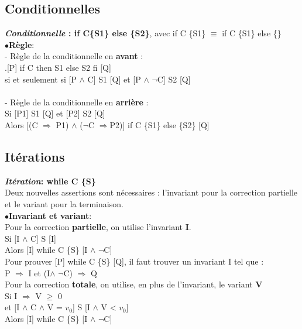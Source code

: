 \subsection{Conditionnelles}
\textbf{\textit{Conditionnelle} : if C\{S1\} else \{S2\}}, avec if C \{S1\} $\equiv$ if C \{S1\} else \{\} \\

$\bullet$\textbf{Règle}:\\
- Règle de la conditionnelle en \textbf{avant} :\\
.[P] if C then S1 else S2 fi [Q] \\si et seulement si  [P $ \wedge$ C] S1 [Q] et [P $\wedge$ $\neg$C] S2 [Q]\\\vspace{2,5mm}\\
- Règle de la conditionnelle en \textbf{arrière} :\\
Si [P1] S1 [Q] et [P2] S2 [Q] \\ Alors [(C $\Rightarrow$ P1) $\wedge$ ($\neg$C $\Rightarrow$P2)] if C \{S1\} else \{S2\} [Q]
\subsection{Itérations}
\textbf{\textit{Itération}: while C \{S\}}\\
Deux nouvelles assertions sont nécessaires : l'invariant pour la correction partielle et le variant pour la terminaison.\\

$\bullet$\textbf{Invariant et variant}:\\

Pour la correction \textbf{partielle}, on utilise l'invariant \textbf{I}.\\
Si [I $\wedge$ C] S [I] \\Alors [I] while C \{S\} [I $\wedge$ $\neg$C]\\
Pour prouver [P] while C \{S\} [Q], il faut trouver un invariant I tel que :\\
P $\Rightarrow$ I et (I$\wedge$ $\neg$C) $\Rightarrow$ Q\\

Pour la correction \textbf{totale}, on utilise, en plus de l'invariant, le variant \textbf{V}\\
Si I $\Rightarrow$ V $\geq$ 0 \\ et [I $\wedge$ C $\wedge$ V = $v_0$] S [I $\wedge$ V < $v_0$] \\Alors [I] while C \{S\} [I $\wedge$ $\neg$C]